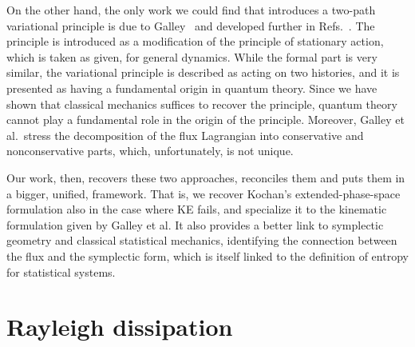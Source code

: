 \documentclass[nofootinbib,aps,pre]{revtex4-2}
\begin{document}
On the other hand, the only work we could find that introduces a two-path variational principle is due to Galley~\cite{galley} and developed further in Refs.~\cite{galleytsangstein,martindiego}. The principle is introduced as a modification of the principle of stationary action, which is taken as given, for general dynamics. While the formal part is very similar, the variational principle is described as acting on two histories, and it is presented as having a fundamental origin in quantum theory. Since we have shown that classical mechanics suffices to recover the principle, quantum theory cannot play a fundamental role in the origin of the principle. Moreover, Galley et al.~stress the decomposition of the flux Lagrangian into conservative and nonconservative parts, which, unfortunately, is not unique.

Our work, then, recovers these two approaches, reconciles them and puts them in a bigger, unified, framework. That is, we recover Kochan's extended-phase-space formulation also in the case where KE fails, and specialize it to the kinematic formulation given by Galley et al. It also provides a better link to symplectic geometry and classical statistical mechanics, identifying the connection between the flux and the symplectic form, which is itself linked to the definition of entropy for statistical systems.

\section{Rayleigh dissipation}
\end{document}
